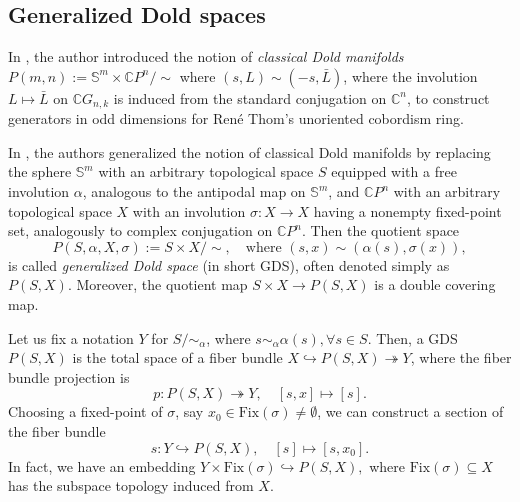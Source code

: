 \documentclass{amsart}
\begin{document}
	\subsection{Generalized Dold spaces}  \label{gen dold}
	In \cite{dold}, the author introduced the notion of \textit{classical Dold manifolds}  
	$P(m,n) := \mathbb{S}^m \times \mathbb{C}P^n / \!\! \sim$  
	where $ (s, L) \sim (-s, \bar{L}) $, where the involution $L\mapsto\bar L$ on $\mathbb CG_{n,k}$ is induced from the standard conjugation on $\mathbb C^n$, to construct generators in odd dimensions for René Thom's unoriented cobordism ring. %
	
	In \cite{nath-sankaran, mandal-sankaran}, the authors generalized the notion of classical Dold manifolds by replacing the sphere $ \mathbb{S}^m $ with an arbitrary topological space $ S $ equipped with a free involution $ \alpha $, analogous to the antipodal map on $ \mathbb{S}^m $, and $ \mathbb CP^n $ with an arbitrary topological space $ X $ with an involution $ \sigma: X \to X $ having a nonempty fixed-point set, analogously to complex conjugation on $\mathbb CP^n$. Then the quotient space  
	\begin{equation}\label{gen dold space}
		P(S, \alpha, X, \sigma) := S \times X / \!\! \sim, \quad \text{where } (s, x) \sim (\alpha(s), \sigma(x)), 
	\end{equation}  
	is called \textit{generalized Dold space} (in short GDS), often denoted simply as $ P(S, X) $. Moreover, the quotient map  
	$ S \times X \to P(S,X) $  
	is a double covering map. %
	
	Let us fix a notation $ Y $ for $ S/\!\!\sim_{\alpha} $, where $ s\sim_{\alpha} \alpha(s), \forall s\in S $. Then, a GDS $ P(S,X) $ is the total space of a fiber bundle  
	$X\hookrightarrow P(S,X) \twoheadrightarrow Y $, where the fiber bundle projection is \begin{equation}\label{proj}
		p: P(S,X) \twoheadrightarrow Y, \quad [s,x]\mapsto [s].
	\end{equation}  Choosing a fixed-point of $\sigma$, say $x_0\in \text{Fix}(\sigma)\neq \emptyset$, we can construct a section of the fiber bundle \begin{equation}\label{sectio}
		s: Y \hookrightarrow P(S,X), \quad [s]\mapsto [s,x_0].
	\end{equation}    
	In fact, we have an embedding  
	$Y\times \text{Fix}(\sigma)\hookrightarrow P(S,X),$  
	where $ \text{Fix}(\sigma) \subseteq X $ has the subspace topology induced from $ X $.
	
\end{document}

